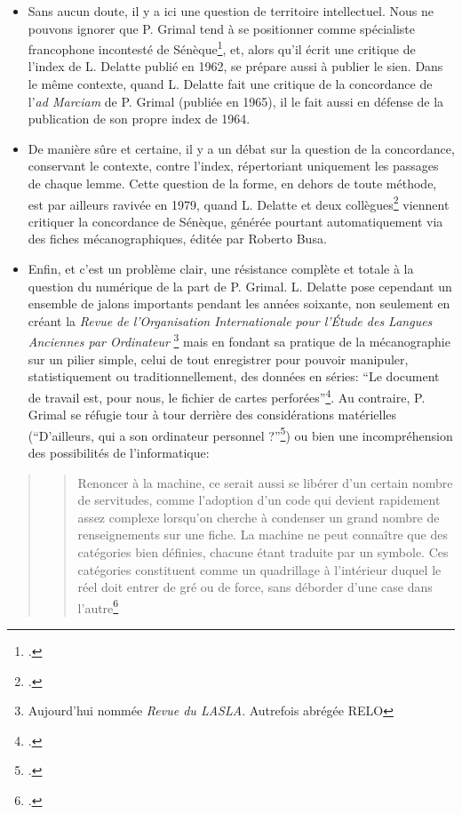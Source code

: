 \begin{itemize}
    \item Sans aucun doute, il y a ici une question de territoire intellectuel. Nous ne pouvons ignorer que P. Grimal tend à se positionner comme spécialiste francophone incontesté de Sénèque\footcite{verdiere_pierre_1970}, et, alors qu'il écrit une critique de l'index de L. Delatte publié en 1962, se prépare aussi à publier le sien. Dans le même contexte, quand L. Delatte fait une critique de la concordance de l'\textit{ad Marciam} de P. Grimal (publiée en 1965), il le fait aussi en défense de la publication de son propre index de 1964.
    \item De manière sûre et certaine, il y a un débat sur la question de la concordance, conservant le contexte, contre l'index, répertoriant uniquement les passages de chaque lemme. Cette question de la forme, en dehors de toute méthode, est par ailleurs ravivée en 1979, quand L. Delatte et deux collègues\footcite{delatte_concordantiae_1979} viennent critiquer la concordance de Sénèque, générée pourtant automatiquement via des fiches mécanographiques, éditée par Roberto Busa.
    \item Enfin, et c'est un problème clair, une résistance complète et totale à la question du numérique de la part de P. Grimal. L. Delatte pose cependant un ensemble de jalons importants pendant les années soixante, non seulement en créant la \textit{Revue de l'Organisation Internationale pour l'Étude des Langues Anciennes par Ordinateur} \footnote{Aujourd'hui nommée \textit{Revue du LASLA}. Autrefois abrégée RELO} mais en fondant sa pratique de la mécanographie sur un pilier simple, celui de tout enregistrer pour pouvoir manipuler, statistiquement ou traditionnellement, des données en séries: \enquote{Le document de travail est, pour nous, le fichier de cartes perforées}\footcite[p~.202]{delatte_index_1968}. Au contraire, P. Grimal se réfugie tour à tour derrière des considérations matérielles (\enquote{D’ailleurs, qui a son ordinateur personnel ?}\footcite[p.~111]{grimal_index_1966}) ou bien une incompréhension des possibilités de l'informatique:
\end{itemize}
    

\begin{quote}
    \blockquote{Renoncer à la machine, ce serait aussi se libérer d'un certain nombre de servitudes, comme l'adoption d'un code qui devient rapidement assez complexe lorsqu'on cherche à condenser un grand nombre de renseignements sur une fiche. La machine ne peut connaître que des catégories bien définies, chacune étant traduite par un symbole. Ces catégories constituent comme un quadrillage à l'intérieur duquel le réel doit entrer de gré ou de force, sans déborder d'une case dans l'autre\footcite[p.~131]{grimal_delatte_1964}}
\end{quote}


